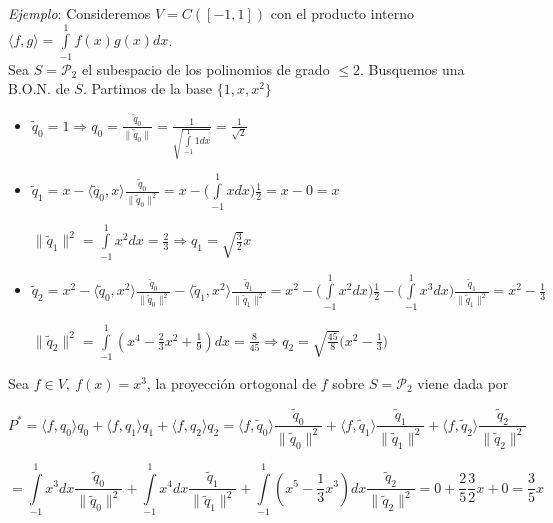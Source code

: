 \textit{Ejemplo}: Consideremos $V = C([-1, 1])$ con el producto interno $\langle f, g \rangle = \int \limits_{-1}^{1} f(x)g(x) dx$.\\

Sea $S = \mathcal{P}_{2}$ el subespacio de los polinomios de grado $\leq 2$. Busquemos una B.O.N. de $S$. Partimos de la base $\{1, x, x^{2}\}$

\begin{itemize}
	\item $\tilde{q}_{0} = 1 \Rightarrow q_{0} = \frac{\tilde{q}_{0}}{\|\tilde{q}_{0}\|} = \frac{1}{\sqrt{\int \limits_{-1}^{1} 1 dx}} = \frac{1}{\sqrt{2}}$
	
	\item $\tilde{q}_{1} = x - \langle \tilde{q}_{0}, x \rangle \frac{\tilde{q}_{0}}{\|\tilde{q}_{0}\|^{2}} = x - \bigg(\int \limits_{-1}^{1} x dx \bigg)\frac{1}{2} = x - 0 = x$
	
	$\|\tilde{q}_{1}\|^{2} = \int \limits_{-1}^{1} x^{2} dx = \frac{2}{3} \Rightarrow q_{1} = \sqrt{\frac{3}{2}}x$
	
	\item $\tilde{q}_{2} = x^{2} - \langle \tilde{q}_{0}, x^{2} \rangle \frac{\tilde{q}_{0}}{\|\tilde{q}_{0}\|^{2}} -  \langle \tilde{q}_{1}, x^{2} \rangle \frac{\tilde{q}_{1}}{\|\tilde{q}_{1}\|^{2}} = x^{2} - \bigg(\int \limits_{-1}^{1} x^{2} dx \bigg)\frac{1}{2} - \bigg(\int \limits_{-1}^{1} x^{3} dx \bigg)\frac{\tilde{q}_{1}}{\|\tilde{q}_{1}\|^{2}}= x^{2} - \frac{1}{3}$
	
	$\|\tilde{q}_{2}\|^{2} = \int \limits_{-1}^{1} (x^{4} - \frac{2}{3}x^{2} + \frac{1}{9}) dx = \frac{8}{45} \Rightarrow q_{2} = \sqrt{\frac{45}{8}}\bigg(x^{2} - \frac{1}{3} \bigg)$
\end{itemize}

Sea $f \in V,\ f(x) = x^{3}$, la proyecci\'on ortogonal de $f$ sobre $S = \mathcal{P}_{2}$ viene dada por

$$P^{*} = \langle f, q_{0} \rangle q_{0} + \langle f, q_{1} \rangle q_{1} + \langle f, q_{2} \rangle q_{2} = \langle f, \tilde{q}_{0} \rangle \frac{\tilde{q}_{0}}{\| \tilde{q}_{0}\|^{2}} + \langle f, \tilde{q}_{1} \rangle \frac{\tilde{q}_{1}}{\| \tilde{q}_{1}\|^{2}} + \langle f, \tilde{q}_{2} \rangle \frac{\tilde{q}_{2}}{\| \tilde{q}_{2}\|^{2}}$$

$$= \int \limits_{-1}^{1} x^{3} dx \frac{\tilde{q}_{0}}{\| \tilde{q}_{0}\|^{2}}+ \int \limits_{-1}^{1} x^{4} dx  \frac{\tilde{q}_{1}}{\| \tilde{q}_{1}\|^{2}}+ \int \limits_{-1}^{1} (x^{5} - \frac{1}{3}x^{3}) dx \frac{\tilde{q}_{2}}{\| \tilde{q}_{2}\|^{2}} = 0 + \frac{2}{5}\frac{3}{2}x + 0 = \frac{3}{5}x$$\\

